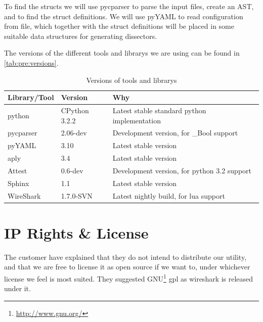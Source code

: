 To find the \glspl{struct} we will use \gls{pycparser} to parse the input files, create an
\gls{AST}, and to find the \gls{struct} definitions. We will use pyYAML to
read configuration from file, which together with the \gls{struct} definitions will
be placed in some suitable data structures for generating \glspl{dissector}.

The versions of the different tools and \glspl{library} we are using can be found in
\autoref{tab:pre:versions}.
\begin{table}[!h] \footnotesize \center
\vspace{-10pt}
\caption{Versions of tools and \glspl{library}\label{tab:pre:versions}}
\begin{tabular}{l l l}
	\toprule
	Library/Tool & Version & Why \\
	\midrule
	\Gls{python} & CPython 3.2.2 & Latest stable standard \Gls{python} implementation \\
	\gls{pycparser} & 2.06-dev & Development version, for \_Bool support \\
	pyYAML & 3.10 & Latest stable version \\
	\Gls{aply} & 3.4 & Latest stable version \\
	Attest & 0.6-dev & Development version, for \Gls{python} 3.2 support \\
	Sphinx & 1.1 & Latest stable version \\
	WireShark & 1.7.0-SVN & Latest nightly build, for \Gls{lua} support \\
	\bottomrule
\end{tabular}
\vspace{-10pt}
\end{table}


\section{IP Rights \& License}
\label{sec:pre:license}
The customer have explained that they do not intend to distribute our \gls{utility},
and that we are free to license it as open source if we want to, under
whichever license we feel is most suited. They suggested GNU\footnote{\url{http://www.gnu.org/}} \Gls{gpl} as \Gls{wireshark}
is released under it.

